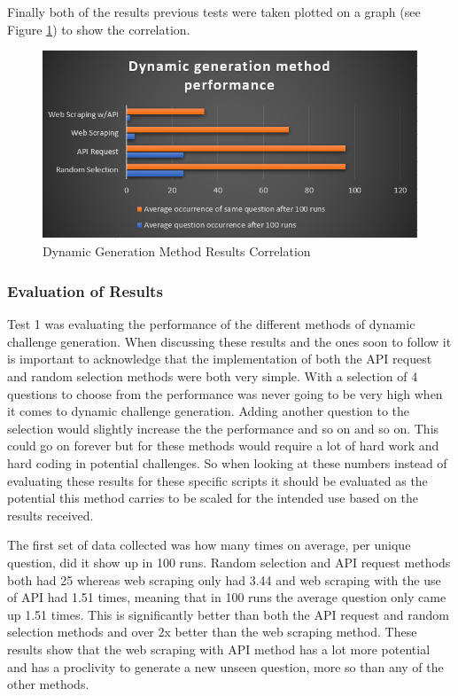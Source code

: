 \documentclass[12pt,a4paper]{article}
\begin{document}
Finally both of the results previous tests were taken plotted on a graph  (see Figure \ref{r3}) to show the correlation.

\begin{figure}[!ht]
    \centering
    \includegraphics[width=1.0\textwidth]{Figs/results3.PNG} 
    \caption{Dynamic Generation Method Results Correlation} 
    \label{r3}
\end{figure}  

\subsubsection{Evaluation of Results} 

Test 1 was evaluating the performance of the different methods of dynamic challenge generation. When discussing these results and the ones soon to follow it is important to acknowledge that the implementation of both the API request and random selection methods were both very simple. With a selection of 4 questions to choose from the performance was never going to be very high when it comes to dynamic challenge generation. Adding another question to the selection would slightly increase the the performance and so on and so on. This could go on forever but for these methods would require a lot of hard work and hard coding in potential challenges. So when looking at these numbers instead of evaluating these results for these specific scripts it should be evaluated as the potential this method carries to be scaled for the intended use based on the results received.  

The first set of data collected was how many times on average, per unique question, did it show up in 100 runs. Random selection and API request methods both had 25 whereas web scraping only had 3.44 and web scraping with the use of API had 1.51 times, meaning that in 100 runs the average question only came up 1.51 times. This is significantly better than both the API request and random selection methods and over 2x better than the web scraping method. These results show that the web scraping with API method has a lot more potential and has a proclivity to generate a new unseen question, more so than any of the other methods. 
\end{document}
